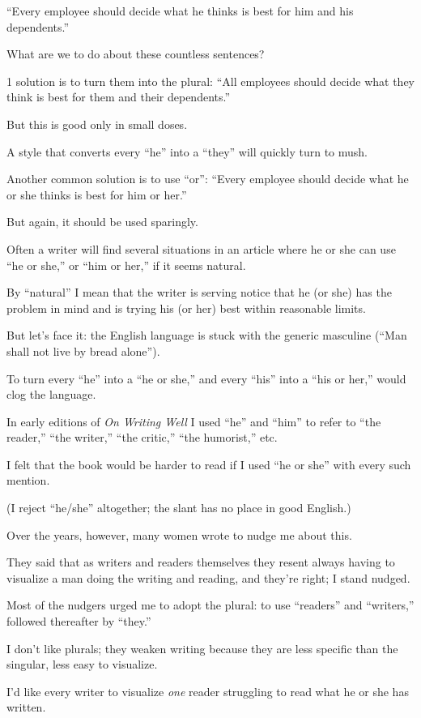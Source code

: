 \documentclass{book}
\numberwithin{equation}{section}
\begin{document}
``Every employee should decide what he thinks is best for him and his dependents.''

What are we to do about these countless sentences?

1 solution is to turn them into the plural: ``All employees should decide what they think is best for them and their dependents.''

But this is good only in small doses.

A style that converts every ``he'' into a ``they'' will quickly turn to mush.

%
Another common solution is to use ``or'': ``Every employee should decide what he or she thinks is best for him or her.''

But again, it should be used sparingly.

Often a writer will find several situations in an article where he or she can use ``he or she,'' or ``him or her,'' if it seems natural.

By ``natural'' I mean that the writer is serving notice that he (or she) has the problem in mind and is trying his (or her) best within reasonable limits.

But let's face it: the English language is stuck with the generic masculine (``Man shall not live by bread alone'').

To turn every ``he'' into a ``he or she,'' and every ``his'' into a ``his or her,'' would clog the language.

%
In early editions of \textit{On Writing Well} I used ``he'' and ``him'' to refer to ``the reader,'' ``the writer,'' ``the critic,'' ``the humorist,'' etc.

I felt that the book would be harder to read if I used ``he or she'' with every such mention.

(I reject ``he/she'' altogether; the slant has no place in good English.)

Over the years, however, many women wrote to nudge me about this.

They said that as writers and readers themselves they resent always having to visualize a man doing the writing and reading, and they're right; I stand nudged.

Most of the nudgers urged me to adopt the plural: to use ``readers'' and ``writers,'' followed thereafter by ``they.''

I don't like plurals; they weaken writing because they are less specific than the singular, less easy to visualize.

I'd like every writer to visualize \textit{one} reader struggling to read what he or she has written.
\end{document}

